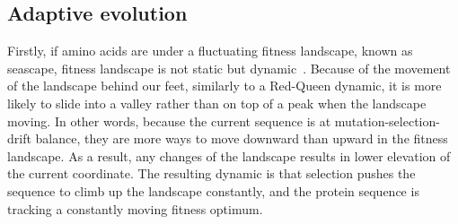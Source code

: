 \begin{table}[H]
    \centering
    \noindent{}
    \caption[Parameters of classical and mechanistic codon models]{Relationship between classical and mechanistic codon models}
    \label{table:params-codon-models}
\end{table}

\subsection{Adaptive evolution}
\label{subsec:adaptive-evolution}

Firstly, if amino acids are under a fluctuating fitness landscape, known as seascape, fitness landscape is not static but dynamic~\citep{Mustonen2009}.
Because of the movement of the landscape behind our feet, similarly to a Red-Queen dynamic, it is more likely to slide into a valley rather than on top of a peak when the landscape moving.
In other words, because the current sequence is at mutation-selection-drift balance, they are more ways to move downward than upward in the fitness landscape.
As a result, any changes of the landscape results in lower elevation of the current coordinate.
The resulting dynamic is that selection pushes the sequence to climb up the landscape constantly, and the protein sequence is tracking a constantly moving fitness optimum.

